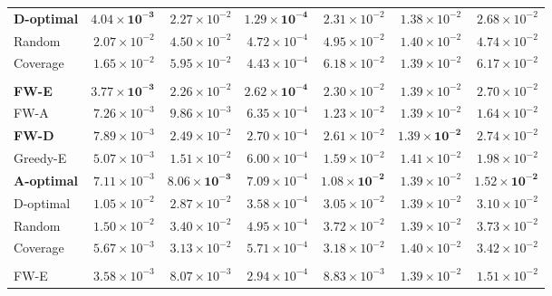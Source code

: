 \documentclass[letterpaper, 9
 pt, conference]{ieeeconf}
\begin{document}
\begin{table}[ht]
\begin{tabular}{lrrrrrr}
\textbf{D-optimal} & $\mathbf{4.04\!\times\!10^{-3}}$ & $2.27\!\times\!10^{-2}$ & $\mathbf{1.29\!\times\!10^{-4}}$ & $2.31\!\times\!10^{-2}$ & $1.38\!\times\!10^{-2}$ & $2.68\!\times\!10^{-2}$ \\
Random & $2.07\!\times\!10^{-2}$ & $4.50\!\times\!10^{-2}$ & $4.72\!\times\!10^{-4}$ & $4.95\!\times\!10^{-2}$ & $1.40\!\times\!10^{-2}$ & $4.74\!\times\!10^{-2}$ \\
Coverage & $1.65\!\times\!10^{-2}$ & $5.95\!\times\!10^{-2}$ & $4.43\!\times\!10^{-4}$ & $6.18\!\times\!10^{-2}$ & $1.39\!\times\!10^{-2}$ & $6.17\!\times\!10^{-2}$ \\
\addlinespace[1pt]
\multicolumn{7}{l}{\textit{$K{=}20$}} \\[1pt]
\textbf{FW-E} & $\mathbf{3.77\!\times\!10^{-3}}$ & $2.26\!\times\!10^{-2}$ & $\mathbf{2.62\!\times\!10^{-4}}$ & $2.30\!\times\!10^{-2}$ & $1.39\!\times\!10^{-2}$ & $2.70\!\times\!10^{-2}$ \\
FW-A & $7.26\!\times\!10^{-3}$ & $9.86\!\times\!10^{-3}$ & $6.35\!\times\!10^{-4}$ & $1.23\!\times\!10^{-2}$ & $1.39\!\times\!10^{-2}$ & $1.64\!\times\!10^{-2}$ \\
\textbf{FW-D} & $7.89\!\times\!10^{-3}$ & $2.49\!\times\!10^{-2}$ & $2.70\!\times\!10^{-4}$ & $2.61\!\times\!10^{-2}$ & $\mathbf{1.39\!\times\!10^{-2}}$ & $2.74\!\times\!10^{-2}$ \\
Greedy-E & $5.07\!\times\!10^{-3}$ & $1.51\!\times\!10^{-2}$ & $6.00\!\times\!10^{-4}$ & $1.59\!\times\!10^{-2}$ & $1.41\!\times\!10^{-2}$ & $1.98\!\times\!10^{-2}$ \\
\textbf{A-optimal} & $7.11\!\times\!10^{-3}$ & $\mathbf{8.06\!\times\!10^{-3}}$ & $7.09\!\times\!10^{-4}$ & $\mathbf{1.08\!\times\!10^{-2}}$ & $1.39\!\times\!10^{-2}$ & $\mathbf{1.52\!\times\!10^{-2}}$ \\
D-optimal & $1.05\!\times\!10^{-2}$ & $2.87\!\times\!10^{-2}$ & $3.58\!\times\!10^{-4}$ & $3.05\!\times\!10^{-2}$ & $1.39\!\times\!10^{-2}$ & $3.10\!\times\!10^{-2}$ \\
Random & $1.50\!\times\!10^{-2}$ & $3.40\!\times\!10^{-2}$ & $4.95\!\times\!10^{-4}$ & $3.72\!\times\!10^{-2}$ & $1.39\!\times\!10^{-2}$ & $3.73\!\times\!10^{-2}$ \\
Coverage & $5.67\!\times\!10^{-3}$ & $3.13\!\times\!10^{-2}$ & $5.71\!\times\!10^{-4}$ & $3.18\!\times\!10^{-2}$ & $1.40\!\times\!10^{-2}$ & $3.42\!\times\!10^{-2}$ \\
\addlinespace[1pt]
\multicolumn{7}{l}{\textit{$K{=}30$}} \\[1pt]
FW-E & $3.58\!\times\!10^{-3}$ & $8.07\!\times\!10^{-3}$ & $2.94\!\times\!10^{-4}$ & $8.83\!\times\!10^{-3}$ & $1.39\!\times\!10^{-2}$ & $1.51\!\times\!10^{-2}$ \\

\end{tabular}
\end{table}
\end{document}
